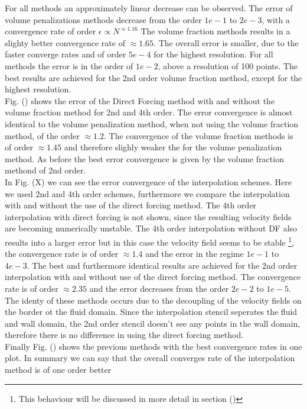 For all methods an approximately linear decrease  can be observed.
The error of volume penalizations methods decrease from the order $1e-1$ to $2e-3$, with
a convergence rate of order  $\epsilon \propto N^{\approx1.16}$
The volume fraction methods results in a slighty better convergence rate of $\approx 1.65$.
The overall error is smaller, due to the faster converge rates and of order $5e-4$ for the
highest resolution. For all methods the error is in the order of $1e-2$, above a resolution of 100 points.
The best results are achieved for the 2nd order volume fraction method, except for the highest resolution.\\
Fig. () shows the error of the Direct Forcing method with and without the volume fraction method for 2nd
and 4th order. The error convergence is almost identical to the volume penalization method, when not using the volume
fraction method, of the order $\approx 1.2$. The convergence of the volume fraction methods is of order $\approx 1.45$
and therefore slighly weaker the for the volume penalization method.
As before the best error convergence is given by the volume fraction methond of 2nd order.\\
In Fig. (X) we can see the error convergence of the interpolation schemes.
Here we used 2nd and 4th order schemes, furthermore we compare the interpolation with and without the
use of the direct forcing method.
The 4th order interpolation with direct forcing is not shown, since the resulting velocity fields are becoming
numerically unstable. The 4th order interpolation without DF also results into a larger error but in this case
the velocity field seems to be stable \footnote{This behaviour will be discussed in more detail in section ()}, the
convergence rate is of order $\approx 1.4$ and the error in the regime $1e-1$ to $4e-3$.
The best and furthermore identical results are achieved for the 2nd order interpolation with and without
use of the direct forcing method. The convergence rate is of order $\approx 2.35$ and the error
decreases from the order $2e-2$ to $1e-5$. The identy of these methods occurs due to the decoupling of the velocity fields
on the border ot the fluid domain. Since the interpolation stencil seperates the fluid and wall domain, the 2nd order
stencil doesn't see any points in the wall domain, therefore there is no difference in using the direct forcing method.\\
Finally Fig. () shows the previous methods with the best convergence rates in one plot.
In summary we can say that the overall converges rate of the interpolation method is of one order better
